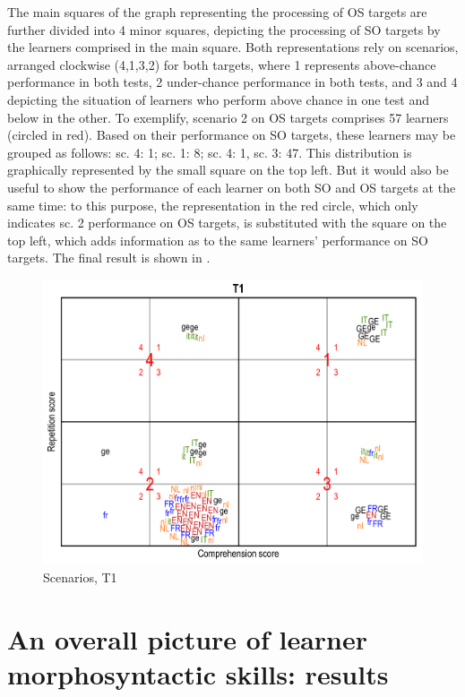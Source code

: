 The main squares of the graph representing the processing of OS targets are further divided into 4 minor squares, depicting the processing of SO targets by the learners comprised in the main square. Both representations rely on scenarios, arranged clockwise (4,1,3,2) for both targets, where 1 represents above-chance performance in both tests, 2 under-chance performance in both tests, and 3 and 4 depicting the situation of learners who perform above chance in one test and below in the other. To exemplify, scenario 2 on OS targets comprises 57 learners (circled in red). Based on their performance on SO targets, these learners may be grouped as follows: sc. 4: 1; sc. 1: 8; sc. 4: 1, sc. 3: 47. This distribution is graphically represented by the small square on the top left. But it would also be useful to show the performance of each learner on both SO and OS targets at the same time: to this purpose, the representation in the red circle, which only indicates sc. 2 performance on OS targets, is substituted with the square on the top left, which adds information as to the same learners’ performance on SO targets. The final result is shown in .

\begin{figure}
    \includegraphics[width=\textwidth]{figures/06-5.pdf}
    \caption{Scenarios, T1}
    \label{fig:06:5}
\end{figure}

\section{An overall picture of learner morphosyntactic skills: results}\label{sec:06:3}

